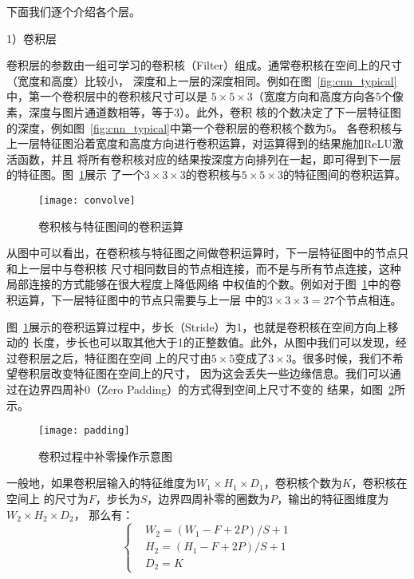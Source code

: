下面我们逐个介绍各个层。

1）卷积层

卷积层的参数由一组可学习的卷积核（Filter）组成。通常卷积核在空间上的尺寸（宽度和高度）比较小，
深度和上一层的深度相同。例如在图~\ref{fig:cnn_typical}中，第一个卷积层中的卷积核尺寸可以是
$5\times 5\times 3$（宽度方向和高度方向各5个像素，深度与图片通道数相等，等于3）。此外，卷积
核的个数决定了下一层特征图的深度，例如图~\ref{fig:cnn_typical}中第一个卷积层的卷积核个数为5。
各卷积核与上一层特征图沿着宽度和高度方向进行卷积运算，对运算得到的结果施加ReLU激活函数，并且
将所有卷积核对应的结果按深度方向排列在一起，即可得到下一层的特征图。图~\ref{fig:convolve}展示
了一个$3\times 3\times 3$的卷积核与$5\times 5\times 3$的特征图间的卷积运算。
\begin{figure}[ht]
  \centering%
  \texttt{[image: convolve]}
  \caption{卷积核与特征图间的卷积运算}
  \label{fig:convolve}
\end{figure}

从图中可以看出，在卷积核与特征图之间做卷积运算时，下一层特征图中的节点只和上一层中与卷积核
尺寸相同数目的节点相连接，而不是与所有节点连接，这种局部连接的方式能够在很大程度上降低网络
中权值的个数。例如对于图~\ref{fig:convolve}中的卷积运算，下一层特征图中的节点只需要与上一层
中的$3\times 3\times 3=27$个节点相连。

图~\ref{fig:convolve}展示的卷积运算过程中，步长（Stride）为1，也就是卷积核在空间方向上移动的
长度，步长也可以取其他大于1的正整数值。此外，从图中我们可以发现，经过卷积层之后，特征图在空间
上的尺寸由$5\times5$变成了$3\times 3$。很多时候，我们不希望卷积层改变特征图在空间上的尺寸，
因为这会丢失一些边缘信息。我们可以通过在边界四周补0（Zero Padding）的方式得到空间上尺寸不变的
结果，如图~\ref{fig:padding}所示。
\begin{figure}[ht]
  \centering%
  \texttt{[image: padding]}
  \caption{卷积过程中补零操作示意图}
  \label{fig:padding}
\end{figure}

一般地，如果卷积层输入的特征维度为$W_1\times H_1 \times D_1$，卷积核个数为$K$，卷积核在空间上
的尺寸为$F$，步长为$S$，边界四周补零的圈数为$P$，输出的特征图维度为$W_2\times H_2\times D_2$，
那么有：
\begin{equation}
  \label{equ:chap3:conv_dim}
  \left\{\begin{aligned}
    & W_2 = (W_1 - F + 2P)/S + 1 \\
    & H_2 = (H_1 - F + 2P)/S + 1 \\
    & D_2 = K
  \end{aligned}\right.
\end{equation}

